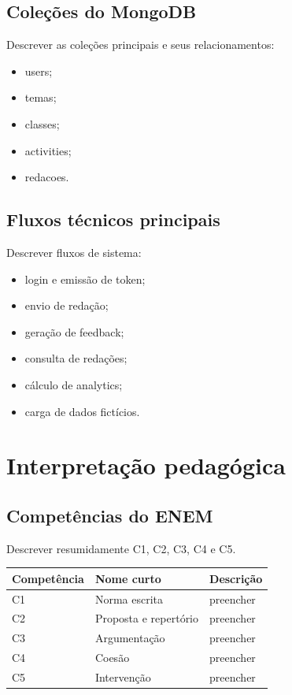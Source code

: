\documentclass[12pt,a4paper]{article}
\begin{document}
\subsection{Coleções do MongoDB}
Descrever as coleções principais e seus relacionamentos:
\begin{itemize}
    \item users;
    \item temas;
    \item classes;
    \item activities;
    \item redacoes.
\end{itemize}

\subsection{Fluxos técnicos principais}
Descrever fluxos de sistema:
\begin{itemize}
    \item login e emissão de token;
    \item envio de redação;
    \item geração de feedback;
    \item consulta de redações;
    \item cálculo de analytics;
    \item carga de dados fictícios.
\end{itemize}

\section{Interpretação pedagógica}

\subsection{Competências do ENEM}
Descrever resumidamente C1, C2, C3, C4 e C5.

\begin{longtable}{|p{2cm}|p{5cm}|p{7cm}|}
\hline
\textbf{Competência} & \textbf{Nome curto} & \textbf{Descrição} \\
\hline
C1 & Norma escrita & preencher \\
\hline
C2 & Proposta e repertório & preencher \\
\hline
C3 & Argumentação & preencher \\
\hline
C4 & Coesão & preencher \\
\hline
C5 & Intervenção & preencher \\
\hline
\end{longtable}
\end{document}
